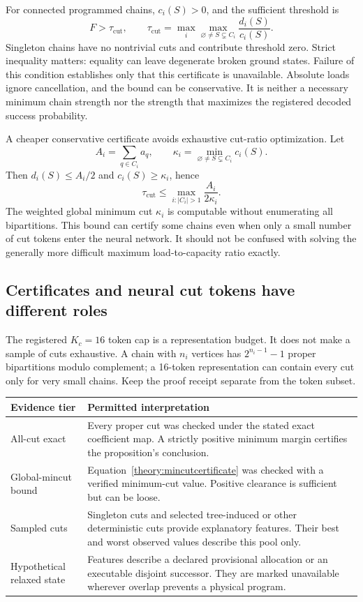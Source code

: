 For connected programmed chains, $c_i(S)>0$, and the sufficient threshold is
\[
 F>\tau_{\mathrm{cut}},\qquad
 \tau_{\mathrm{cut}}=\max_i\max_{\varnothing\ne S\subsetneq C_i}
                       \frac{d_i(S)}{c_i(S)}.
\]
Singleton chains have no nontrivial cuts and contribute threshold zero. Strict inequality matters: equality can leave degenerate broken ground states. Failure of this condition establishes only that this certificate is unavailable. Absolute loads ignore cancellation, and the bound can be conservative. It is neither a necessary minimum chain strength nor the strength that maximizes the registered decoded success probability.

A cheaper conservative certificate avoids exhaustive cut-ratio optimization. Let
\[
 A_i=\sum_{q\in C_i}a_q,
 \qquad \kappa_i=\min_{\varnothing\ne S\subsetneq C_i}c_i(S).
\]
Then $d_i(S)\le A_i/2$ and $c_i(S)\ge\kappa_i$, hence
\begin{equation}
 \tau_{\mathrm{cut}}
 \le\max_{i:|C_i|>1}\frac{A_i}{2\kappa_i}.
 \label{theory:mincutcertificate}
\end{equation}
The weighted global minimum cut $\kappa_i$ is computable without enumerating all bipartitions. This bound can certify some chains even when only a small number of cut tokens enter the neural network. It should not be confused with solving the generally more difficult maximum load-to-capacity ratio exactly.

\subsection{Certificates and neural cut tokens have different roles}
\label{theory:tiers}

The registered $K_c=16$ token cap is a representation budget. It does not make a sample of cuts exhaustive. A chain with $n_i$ vertices has $2^{n_i-1}-1$ proper bipartitions modulo complement; a 16-token representation can contain every cut only for very small chains. Keep the proof receipt separate from the token subset.

{\small
\begin{longtable}{@{}p{}p{}@{}}
\toprule
Evidence tier & Permitted interpretation \\
\midrule
\endhead
All-cut exact & Every proper cut was checked under the stated exact coefficient map. A strictly positive minimum margin certifies the proposition's conclusion. \\
Global-mincut bound & Equation~\eqref{theory:mincutcertificate} was checked with a verified minimum-cut value. Positive clearance is sufficient but can be loose. \\
Sampled cuts & Singleton cuts and selected tree-induced or other deterministic cuts provide explanatory features. Their best and worst observed values describe this pool only. \\
Hypothetical relaxed state & Features describe a declared provisional allocation or an executable disjoint successor. They are marked unavailable wherever overlap prevents a physical program. \\
\bottomrule
\end{longtable}}

